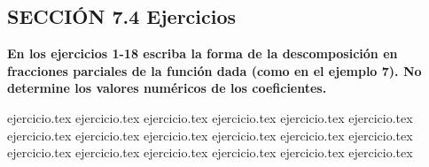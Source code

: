 
\subsection*{SECCIÓN 7.4 \quad Ejercicios}

\noindent\textbf{En los ejercicios 1-18 escriba la forma de la descomposición en fracciones parciales de la función dada (como en el ejemplo 7). No determine los valores numéricos de los coeficientes.}
\begin{enumerate}
    {ejercicio.tex}
{ejercicio.tex}
{ejercicio.tex}
{ejercicio.tex}
{ejercicio.tex}
{ejercicio.tex}
{ejercicio.tex}
{ejercicio.tex}
{ejercicio.tex}
{ejercicio.tex}
{ejercicio.tex}
{ejercicio.tex}
{ejercicio.tex}
{ejercicio.tex}
{ejercicio.tex}
{ejercicio.tex}
{ejercicio.tex}
{ejercicio.tex}
\end{enumerate}

